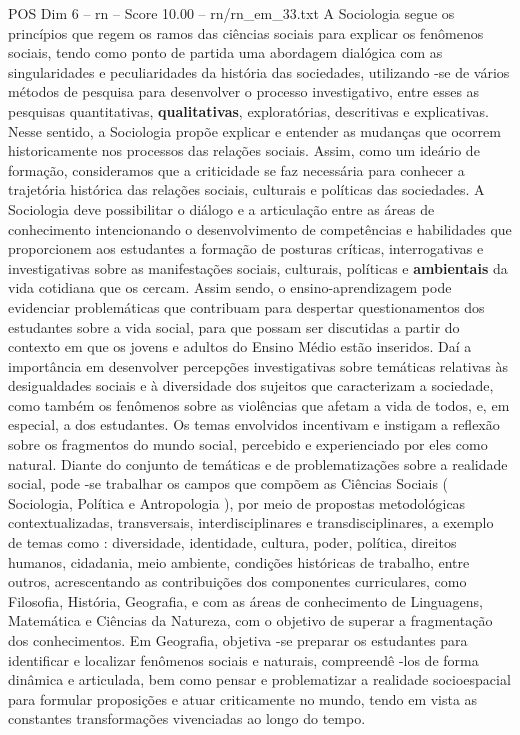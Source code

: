 \begin{textsample}{POS Dim 6 – rn – Score 10.00 – rn/rn\_em\_33.txt}
A Sociologia segue os princípios que regem os ramos das ciências sociais para explicar os fenômenos sociais, tendo como ponto de partida uma abordagem dialógica com as singularidades e peculiaridades da história das sociedades, utilizando -se de vários métodos de pesquisa para desenvolver o processo investigativo, entre esses as pesquisas quantitativas, \textbf{qualitativas}, exploratórias, descritivas e explicativas.
Nesse sentido, a Sociologia propõe explicar e entender as mudanças que ocorrem historicamente nos processos das relações sociais.
Assim, como um ideário de formação, consideramos que a criticidade se faz necessária para conhecer a trajetória histórica das relações sociais, culturais e políticas das sociedades.
A Sociologia deve possibilitar o diálogo e a articulação entre as áreas de conhecimento intencionando o desenvolvimento de competências e habilidades que proporcionem aos estudantes a formação de posturas críticas, interrogativas e investigativas sobre as manifestações sociais, culturais, políticas e \textbf{ambientais} da vida cotidiana que os cercam.
Assim sendo, o ensino-aprendizagem pode evidenciar problemáticas que contribuam para despertar questionamentos dos estudantes sobre a vida social, para que possam ser discutidas a partir do contexto em que os jovens e adultos do Ensino Médio estão inseridos.
Daí a importância em desenvolver percepções investigativas sobre temáticas relativas às desigualdades sociais e à diversidade dos sujeitos que caracterizam a sociedade, como também os fenômenos sobre as violências que afetam a vida de todos, e, em especial, a dos estudantes.
Os temas envolvidos incentivam e instigam a reflexão sobre os fragmentos do mundo social, percebido e experienciado por eles como natural.
Diante do conjunto de temáticas e de problematizações sobre a realidade social, pode -se trabalhar os campos que compõem as Ciências Sociais ( Sociologia, Política e Antropologia ), por meio de propostas metodológicas contextualizadas, transversais, interdisciplinares e transdisciplinares, a exemplo de temas como : diversidade, identidade, cultura, poder, política, direitos humanos, cidadania, meio ambiente, condições históricas de trabalho, entre outros, acrescentando as contribuições dos componentes curriculares, como Filosofia, História, Geografia, e com as áreas de conhecimento de Linguagens, Matemática e Ciências da Natureza, com o objetivo de superar a fragmentação dos conhecimentos.
Em Geografia, objetiva -se preparar os estudantes para identificar e localizar fenômenos sociais e naturais, compreendê -los de forma dinâmica e articulada, bem como pensar e problematizar a realidade socioespacial para formular proposições e atuar criticamente no mundo, tendo em vista as constantes transformações vivenciadas ao longo do tempo.

\end{textsample}
